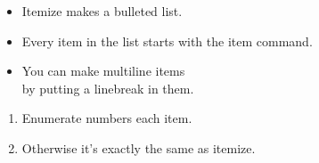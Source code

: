 \begin{itemize}
	\item Itemize makes a bulleted list.
	\item Every item in the list starts with
		the item command.
	\item You can make multiline items\\
		by putting a linebreak in them.
\end{itemize}

\begin{enumerate}
	\item Enumerate numbers each item.
	\item Otherwise it's exactly the same as itemize.
\end{enumerate}

